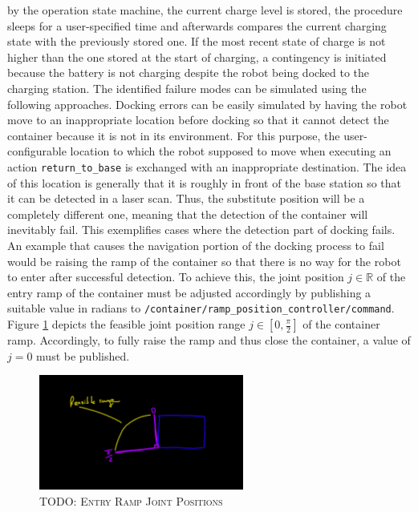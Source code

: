 \documentclass[english, master, utf8]{base/thesis_KBS}
\newcommand{\code}[1]{\colorbox{light-gray}{\texttt{#1}}}
\begin{document}
by the operation state machine, the current charge level is stored, the procedure sleeps for a user-specified time and afterwards compares the current charging state with the
previously stored one. If the most recent state of charge is not higher than the one stored at the start of charging, a contingency is initiated because the battery is not charging
despite the robot being docked to the charging station.\newline
The identified failure modes can be simulated using the following approaches. Docking errors can be easily simulated by having the robot move to an inappropriate location before
docking so that it cannot detect the container because it is not in its environment. For this purpose, the user-configurable location to which the robot supposed to move when
executing an action \code{return\_to\_base} is exchanged with an inappropriate destination. The idea of this location is generally that it is roughly in front of the base station so
that it can be detected in a laser scan. Thus, the substitute position will be a completely different one, meaning that the detection of the container will inevitably fail.
This exemplifies cases where the detection part of docking fails. An example that causes the navigation portion of the docking process to fail would be raising the ramp of the
container so that there is no way for the robot to enter after successful detection. To achieve this, the joint position $j \in \mathbb{R}$ of the entry ramp of the container must be adjusted
accordingly by publishing a suitable value in radians to \code{/container/ramp\_position\_controller/command}. Figure \ref{fig:joint_positions} depicts the feasible joint position
range $j \in [0, \frac{\pi}{2}]$ of the container ramp. Accordingly, to fully raise the ramp and thus close the container, a value of $j = 0$ must be published.
\begin{figure}[H]
    \centering
    \includegraphics[width=0.6\textwidth]{pics/joint_position_container.png}
    \caption{\textsc{TODO: Entry Ramp Joint Positions}}
    \label{fig:joint_positions}
\end{figure}
\end{document}
